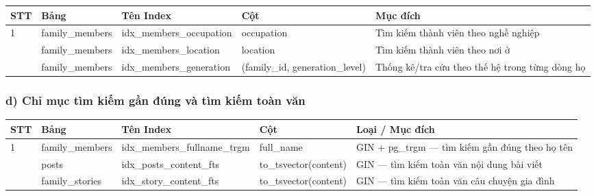 \begin{small}
	\begin{longtable}{|>{\centering\arraybackslash}p{0.6cm}|>{\raggedright\arraybackslash}p{2.3cm}|>{\raggedright\arraybackslash}p{3.8cm}|>{\raggedright\arraybackslash}p{3.0cm}|>{\raggedright\arraybackslash}p{3.8cm}|}
		\hline
		\textbf{STT} & \textbf{Bảng} & \textbf{Tên Index} & \textbf{Cột} & \textbf{Mục đích} \\ \hline
		\endhead
		\hline
		\endfoot
		
		1 & family\_\allowbreak members & idx\_\allowbreak members\_\allowbreak occupation & occupation & Tìm kiếm thành viên theo nghề nghiệp \\ \hline
		2 & family\_\allowbreak members & idx\_\allowbreak members\_\allowbreak location & location & Tìm kiếm thành viên theo nơi ở \\ \hline
		3 & family\_\allowbreak members & idx\_\allowbreak members\_\allowbreak generation & (family\_id, generation\_level) & Thống kê/tra cứu theo thế hệ trong từng dòng họ \\ \hline
	\end{longtable}
\end{small}

\subsubsection{d) Chỉ mục tìm kiếm gần đúng và tìm kiếm toàn văn}

\renewcommand{\arraystretch}{1.3}
\setlength{\tabcolsep}{3pt}

\begin{small}
	\begin{longtable}{|>{\centering\arraybackslash}p{0.6cm}|>{\raggedright\arraybackslash}p{2.3cm}|>{\raggedright\arraybackslash}p{3.8cm}|>{\raggedright\arraybackslash}p{3.0cm}|>{\raggedright\arraybackslash}p{3.8cm}|}
		\hline
		\textbf{STT} & \textbf{Bảng} & \textbf{Tên Index} & \textbf{Cột} & \textbf{Loại / Mục đích} \\ \hline
		\endhead
		\hline
		\endfoot
		
		1 & family\_\allowbreak members & idx\_\allowbreak members\_\allowbreak fullname\_\allowbreak trgm & full\_name & GIN + pg\_trgm --- tìm kiếm gần đúng theo họ tên \\ \hline
		2 & posts & idx\_\allowbreak posts\_\allowbreak content\_\allowbreak fts & to\_tsvector(content) & GIN --- tìm kiếm toàn văn nội dung bài viết \\ \hline
		3 & family\_\allowbreak stories & idx\_\allowbreak story\_\allowbreak content\_\allowbreak fts & to\_tsvector(content) & GIN --- tìm kiếm toàn văn câu chuyện gia đình \\ \hline
	\end{longtable}
\end{small}

